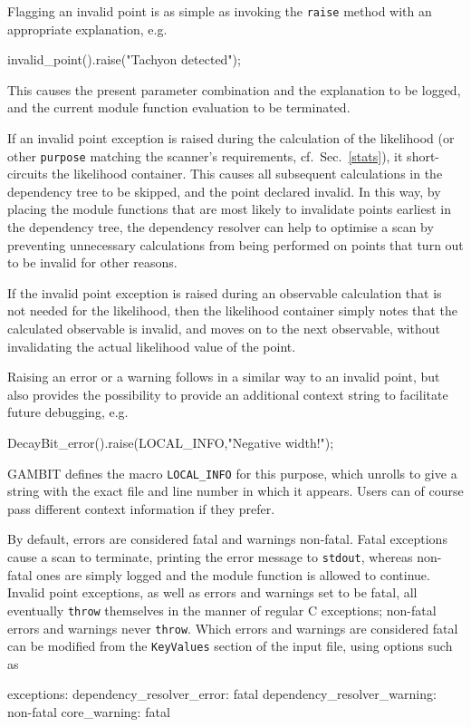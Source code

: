 \documentclass[pdftex,twocolumn,epjc3_preprint,runningheads]{svjour3}
\renewcommand{\_}{\discretionary{\underscore}{}{\underscore}}
\newcommand\cpp[1]{{\lstinline!#1!}}  %
\newcommand\yaml[1]{{\lstset{style=yaml}\lstinline!#1!\lstset{style=cpp}}}
\newcommand\term[1]{{\lstset{style=terminal}\lstinline!#1!\lstset{style=cpp}}}
\newcommand{\gambit}{\textsf{GAMBIT}\xspace}
\newcommand{\GB}{\gambit}
\newcommand\xx{\raisebox{0.2ex}{\smaller ++}\xspace}
\newcommand\Cpp{\textsf{C\xx}\xspace}
\begin{document}
Flagging an invalid point is as simple as invoking the \lstinline{raise} method with an appropriate explanation, e.g.
\begin{lstcpp}
invalid_point().raise("Tachyon detected");
\end{lstcpp}
This causes the present parameter combination and the explanation to be logged, and the current module function evaluation to be terminated.

If an invalid point exception is raised during the calculation of the likelihood (or other \yaml{purpose} matching the scanner's requirements, cf.\ Sec.\ \ref{stats}), it short-circuits the likelihood container.  This causes all subsequent calculations in the dependency tree to be skipped, and the point declared invalid.  In this way, by placing the module functions that are most likely to invalidate points earliest in the dependency tree, the dependency resolver can help to optimise a scan by preventing unnecessary calculations from being performed on points that turn out to be invalid for other reasons.

If the invalid point exception is raised during an observable calculation that is not needed for the likelihood, then the likelihood container simply notes that the calculated observable is invalid, and moves on to the next observable, without invalidating the actual likelihood value of the point.

Raising an error or a warning follows in a similar way to an invalid point, but also provides the possibility to provide an additional context string to facilitate future debugging, e.g.
\begin{lstcpp}
DecayBit_error().raise(LOCAL_INFO,"Negative
 width!");
\end{lstcpp}
\GB defines the macro \lstinline{LOCAL_INFO} for this purpose, which unrolls to give a string with the exact file and line number in which it appears.  Users can of course pass different context information if they prefer.

By default, errors are considered fatal and warnings non-fatal.  Fatal exceptions cause a scan to terminate, printing the error message to \mbox{\term{stdout},} whereas non-fatal ones are simply logged and the module function is allowed to continue.  Invalid point exceptions, as well as errors and warnings set to be fatal, all eventually \cpp{throw} themselves in the manner of regular \Cpp exceptions; non-fatal errors and warnings never \cpp{throw}.  Which errors and warnings are considered fatal can be modified from the \yaml{KeyValues} section of the input file, using options such as
\begin{lstyaml}
exceptions:
  dependency_resolver_error: fatal
  dependency_resolver_warning: non-fatal
  core_warning: fatal
\end{lstyaml}
\end{document}
